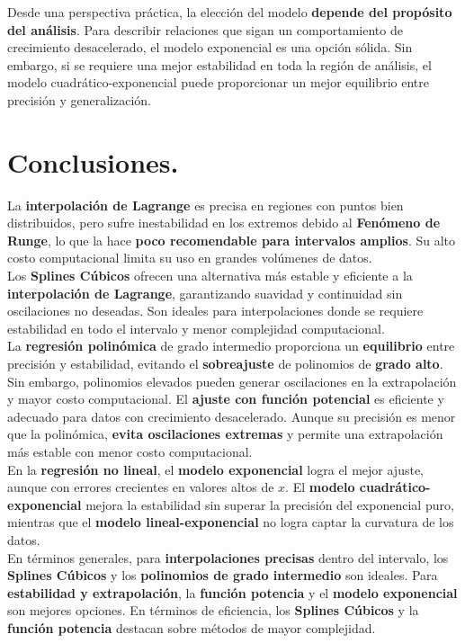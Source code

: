 \documentclass{article}
\begin{document}
Desde una perspectiva práctica, la elección del modelo \textbf{depende del propósito del análisis}. Para describir relaciones que sigan un comportamiento de crecimiento desacelerado, el modelo exponencial es una opción sólida. Sin embargo, si se requiere una mejor estabilidad en toda la región de análisis, el modelo cuadrático-exponencial puede proporcionar un mejor equilibrio entre precisión y generalización.

\newpage
\section{Conclusiones.}

La \textbf{interpolación de Lagrange} es precisa en regiones con puntos bien distribuidos, pero sufre inestabilidad en los extremos debido al \textbf{Fenómeno de Runge}, lo que la hace \textbf{poco recomendable para intervalos amplios}. Su alto costo computacional limita su uso en grandes volúmenes de datos.  \\


Los \textbf{Splines Cúbicos} ofrecen una alternativa más estable y eficiente a la \textbf{interpolación de Lagrange}, garantizando suavidad y continuidad sin oscilaciones no deseadas. Son ideales para interpolaciones donde se requiere estabilidad en todo el intervalo y menor complejidad computacional.   \\

La \textbf{regresión polinómica} de grado intermedio proporciona un \textbf{equilibrio} entre precisión y estabilidad, evitando el \textbf{sobreajuste} de polinomios de \textbf{grado alto}. Sin embargo, polinomios elevados pueden generar oscilaciones en la extrapolación y mayor costo computacional. El \textbf{ajuste con función potencial} es eficiente y adecuado para datos con crecimiento desacelerado. Aunque su precisión es menor que la polinómica, \textbf{evita oscilaciones extremas} y permite una extrapolación más estable con menor costo computacional.   \\

En la \textbf{regresión no lineal}, el \textbf{modelo exponencial} logra el mejor ajuste, aunque con errores crecientes en valores altos de $x$. El \textbf{modelo cuadrático-exponencial} mejora la estabilidad sin superar la precisión del exponencial puro, mientras que el \textbf{modelo lineal-exponencial} no logra captar la curvatura de los datos.   \\

En términos generales, para \textbf{interpolaciones precisas} dentro del intervalo, los \textbf{Splines Cúbicos} y los \textbf{polinomios de grado intermedio} son ideales. Para \textbf{estabilidad y extrapolación}, la \textbf{función potencia} y el \textbf{modelo exponencial} son mejores opciones. En términos de eficiencia, los \textbf{Splines Cúbicos} y la \textbf{función potencia} destacan sobre métodos de mayor complejidad.
\end{document}
